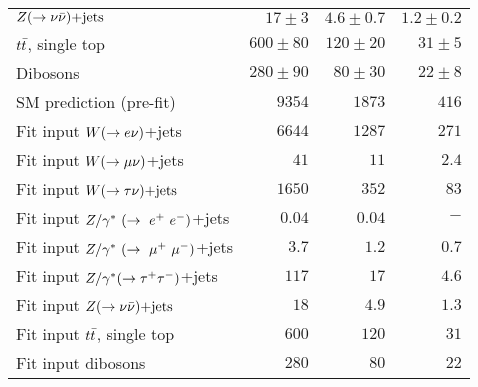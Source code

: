\begin{table}[!ht]
\begin{center}
\begin{small}
\begin{tabular*}{\textwidth}{@{\extracolsep{\fill}}lrrr}
    $Z(\rightarrow \nu \bar{\nu})\text{+jets}$        &                      $17 \pm 3$            &  $4.6 \pm 0.7$                & $1.2 \pm 0.2$   \\
                                                                                                               
    $t\bar{t}$, single top &               $600 \pm 80$          &  $120 \pm 20$                 & $31 \pm 5$    \\
                                                                                                               
    Dibosons      &                      $280 \pm 90$          &  $80 \pm 30$                  & $22 \pm 8$   \\  \hline

    SM prediction (pre-fit)                 & $9354$  & $1873$ & $416$ \\                      
    \hline                                                 
                                                                 
    Fit input $W(\rightarrow e \nu)$+jets                  & $6644$  & $1287$ & $271$ \\
    Fit input $W(\rightarrow \mu \nu)$+jets                  & $41$    & $11$   & $2.4$ \\
    Fit input $W(\rightarrow \tau \nu)\text{+jets}$                  & $1650$  & $352$  & $83$  \\
    Fit input $Z/\gamma^*~(\rightarrow~e^+~e^-)$+jets                  & $0.04$  & $0.04$ & $-$   \\
    Fit input $Z/\gamma^*~(\rightarrow~\mu^+~\mu^-)$+jets                  & $3.7$   & $1.2$  & $0.7$ \\
    Fit input $Z/\gamma^*(\rightarrow \tau^+ \tau^-)$+jets                  & $117$   & $17$   & $4.6$ \\
    Fit input $Z(\rightarrow \nu \bar{\nu})\text{+jets}$                  & $18$    & $4.9$  & $1.3$ \\
    Fit input $t\bar{t}$, single top    & $600$   & $120$  & $31$  \\
    Fit input dibosons                & $280$   & $80$   & $22$  \\


\end{tabular*}
\end{small}
\end{center}
\end{table}
